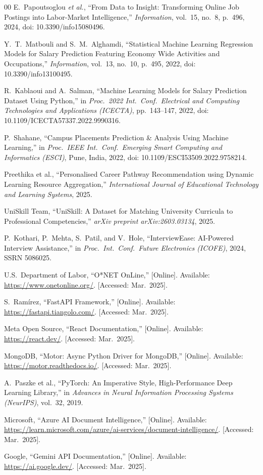 \documentclass[conference]{IEEEtran}
\begin{document}
\begin{thebibliography}{00}
E.\ Papoutsoglou \emph{et al.}, ``From Data to Insight: Transforming
Online Job Postings into Labor-Market Intelligence,'' \emph{Information},
vol.\ 15, no.\ 8, p.\ 496, 2024, doi: 10.3390/info15080496.

Y.\ T.\ Matbouli and S.\ M.\ Alghamdi, ``Statistical Machine Learning
Regression Models for Salary Prediction Featuring Economy Wide Activities
and Occupations,'' \emph{Information}, vol.\ 13, no.\ 10, p.\ 495,
2022, doi: 10.3390/info13100495.

R.\ Kablaoui and A.\ Salman, ``Machine Learning Models for Salary
Prediction Dataset Using Python,'' in \emph{Proc.\ 2022 Int.\ Conf.\
Electrical and Computing Technologies and Applications (ICECTA)},
pp.\ 143--147, 2022, doi: 10.1109/ICECTA57337.2022.9990316.

P.\ Shahane, ``Campus Placements Prediction \& Analysis Using Machine
Learning,'' in \emph{Proc.\ IEEE Int.\ Conf.\ Emerging Smart Computing
and Informatics (ESCI)}, Pune, India, 2022,
doi: 10.1109/ESCI53509.2022.9758214.

Preethika et al., ``Personalised Career Pathway Recommendation using
Dynamic Learning Resource Aggregation,'' \emph{International Journal
of Educational Technology and Learning Systems}, 2025.

UniSkill Team, ``UniSkill: A Dataset for Matching University Curricula
to Professional Competencies,'' \emph{arXiv preprint arXiv:2603.03134},
2025.

P.\ Kothari, P.\ Mehta, S.\ Patil, and V.\ Hole, ``InterviewEase:
AI-Powered Interview Assistance,'' in \emph{Proc.\ Int.\ Conf.\ Future
Electronics (ICOFE)}, 2024, SSRN 5086025.

U.S.\ Department of Labor, ``O*NET OnLine,'' [Online]. Available:
\url{https://www.onetonline.org/}. [Accessed: Mar.\ 2025].

S.\ Ram\'irez, ``FastAPI Framework,'' [Online]. Available:
\url{https://fastapi.tiangolo.com/}. [Accessed: Mar.\ 2025].

Meta Open Source, ``React Documentation,'' [Online]. Available:
\url{https://react.dev/}. [Accessed: Mar.\ 2025].

MongoDB, ``Motor: Async Python Driver for MongoDB,'' [Online]. Available:
\url{https://motor.readthedocs.io/}. [Accessed: Mar.\ 2025].

A.\ Paszke et al., ``PyTorch: An Imperative Style, High-Performance
Deep Learning Library,'' in \emph{Advances in Neural Information
Processing Systems (NeurIPS)}, vol.\ 32, 2019.

Microsoft, ``Azure AI Document Intelligence,'' [Online]. Available:
\url{https://learn.microsoft.com/azure/ai-services/document-intelligence/}.
[Accessed: Mar.\ 2025].

Google, ``Gemini API Documentation,'' [Online]. Available:
\url{https://ai.google.dev/}. [Accessed: Mar.\ 2025].

\end{thebibliography}
\end{document}
